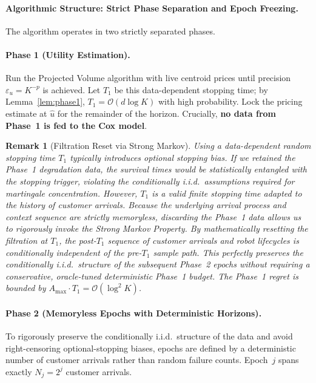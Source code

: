 \documentclass[letterpaper, 10 pt, conference]{IEEEconf}
\newtheorem{remark}{Remark}
\newcommand{\what}[1]{\widehat{#1}}
\begin{document}
\paragraph{Algorithmic Structure: Strict Phase Separation and Epoch Freezing.}
The algorithm operates in two strictly separated phases.

\paragraph{Phase 1 (Utility Estimation).}
Run the Projected Volume algorithm with live centroid prices until precision $\varepsilon_u = K^{-p}$ is achieved. Let $T_1$ be this data-dependent stopping time; by Lemma~\ref{lem:phase1}, $T_1 = \mathcal{O}(d\log K)$ with high probability. Lock the pricing estimate at $\what{u}$ for the remainder of the horizon. Crucially, \textbf{no data from Phase~1 is fed to the Cox model}.

\begin{remark}[Filtration Reset via Strong Markov]
    Using a data-dependent random stopping time $T_1$ typically introduces optional stopping bias. If we retained the Phase~1 degradation data, the survival times would be statistically entangled with the stopping trigger, violating the conditionally i.i.d.\ assumptions required for martingale concentration. However, $T_1$ is a valid finite stopping time adapted to the history of customer arrivals. Because the underlying arrival process and context sequence are strictly memoryless, discarding the Phase~1 data allows us to rigorously invoke the Strong Markov Property. By mathematically resetting the filtration at $T_1$, the post-$T_1$ sequence of customer arrivals and robot lifecycles is conditionally independent of the pre-$T_1$ sample path. This perfectly preserves the conditionally i.i.d.\ structure of the subsequent Phase~2 epochs without requiring a conservative, oracle-tuned deterministic Phase~1 budget. The Phase~1 regret is bounded by $A_{\max} \cdot T_1 = \mathcal{O}(\log^2 K)$.
\end{remark}

\paragraph{Phase 2 (Memoryless Epochs with Deterministic Horizons).}
To rigorously preserve the conditionally i.i.d.\ structure of the data and avoid right-censoring optional-stopping biases, epochs are defined by a deterministic number of customer arrivals rather than random failure counts. Epoch~$j$ spans exactly $N_j = 2^j$ customer arrivals.
\end{document}

